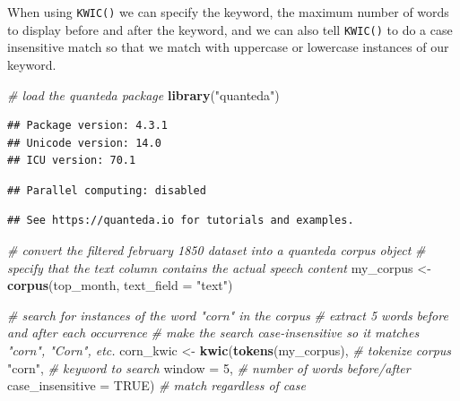 \documentclass[
]{article}
\newenvironment{Shaded}{\begin{snugshade}}{\end{snugshade}}
\newcommand{\AttributeTok}[1]{\textcolor[rgb]{0.13,0.29,0.53}{#1}}
\newcommand{\CommentTok}[1]{\textcolor[rgb]{0.56,0.35,0.01}{\textit{#1}}}
\newcommand{\ConstantTok}[1]{\textcolor[rgb]{0.56,0.35,0.01}{#1}}
\newcommand{\DecValTok}[1]{\textcolor[rgb]{0.00,0.00,0.81}{#1}}
\newcommand{\FunctionTok}[1]{\textcolor[rgb]{0.13,0.29,0.53}{\textbf{#1}}}
\newcommand{\NormalTok}[1]{#1}
\newcommand{\OtherTok}[1]{\textcolor[rgb]{0.56,0.35,0.01}{#1}}
\newcommand{\StringTok}[1]{\textcolor[rgb]{0.31,0.60,0.02}{#1}}
\begin{document}
When using \texttt{KWIC()} we can specify the keyword, the maximum
number of words to display before and after the keyword, and we can also
tell \texttt{KWIC()} to do a case insensitive match so that we match
with uppercase or lowercase instances of our keyword.

\begin{Shaded}
\begin{Highlighting}[]
\CommentTok{\# load the quanteda package}
\FunctionTok{library}\NormalTok{(}\StringTok{"quanteda"}\NormalTok{)}
\end{Highlighting}
\end{Shaded}

\begin{verbatim}
## Package version: 4.3.1
## Unicode version: 14.0
## ICU version: 70.1
\end{verbatim}

\begin{verbatim}
## Parallel computing: disabled
\end{verbatim}

\begin{verbatim}
## See https://quanteda.io for tutorials and examples.
\end{verbatim}

\begin{Shaded}
\begin{Highlighting}[]
\CommentTok{\# convert the filtered february 1850 dataset into a quanteda corpus object}
\CommentTok{\# specify that the \textquotesingle{}text\textquotesingle{} column contains the actual speech content}
\NormalTok{my\_corpus }\OtherTok{\textless{}{-}} \FunctionTok{corpus}\NormalTok{(top\_month, }\AttributeTok{text\_field =} \StringTok{"text"}\NormalTok{) }

\CommentTok{\# search for instances of the word "corn" in the corpus}
\CommentTok{\# extract 5 words before and after each occurrence}
\CommentTok{\# make the search case{-}insensitive so it matches "corn", "Corn", etc.}
\NormalTok{corn\_kwic }\OtherTok{\textless{}{-}} \FunctionTok{kwic}\NormalTok{(}\FunctionTok{tokens}\NormalTok{(my\_corpus), }\CommentTok{\# tokenize corpus}
                  \StringTok{"corn"}\NormalTok{, }\CommentTok{\# keyword to search}
                  \AttributeTok{window =} \DecValTok{5}\NormalTok{, }\CommentTok{\# number of words before/after}
                  \AttributeTok{case\_insensitive =} \ConstantTok{TRUE}\NormalTok{) }\CommentTok{\# match regardless of case}
\end{Highlighting}
\end{Shaded}
\end{document}
